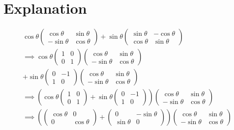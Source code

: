 \documentclass[journal,12pt,twocolumn]{IEEEtran}
\begin{document}
\section{\textbf{Explanation}}
\begin{gather}
    \cos\theta\left(\begin{array}{cc}\cos\theta & \sin\theta \\ -\sin\theta & \cos\theta\end{array}\right)+\sin\theta\left(\begin{array}{cc}\sin\theta & -\cos\theta \\ \cos\theta & \sin\theta\end{array}\right)\\
    \implies\cos\theta\left(\begin{array}{cc} 1 & 0 \\ 0 & 1\end{array}\right)\left(\begin{array}{cc}\cos\theta & \sin\theta \\ -\sin\theta & \cos\theta\end{array}\right)\\\nonumber+\sin\theta\left(\begin{array}{cc} 0 & -1 \\ 1 & 0 \end{array}\right)\left(\begin{array}{cc}\cos\theta & \sin\theta \\ -\sin\theta & \cos\theta\end{array}\right)\\
    \implies\left(\cos\theta\left(\begin{array}{cc} 1 & 0 \\ 0 & 1\end{array}\right)+\sin\theta\left(\begin{array}{cc} 0 & -1 \\ 1 & 0 \end{array}\right)\right)\left(\begin{array}{cc}\cos\theta & \sin\theta \\ -\sin\theta & \cos\theta\end{array}\right)\\
    \implies\left(\left(\begin{array}{cc} \cos\theta & 0 \\ 0 & \cos\theta\end{array}\right)+\left(\begin{array}{cc} 0 & -\sin\theta \\ \sin\theta & 0 \end{array}\right)\right)\left(\begin{array}{cc}\cos\theta & \sin\theta \\ -\sin\theta & \cos\theta\end{array}\right)\\

\end{gather}
\end{document}
